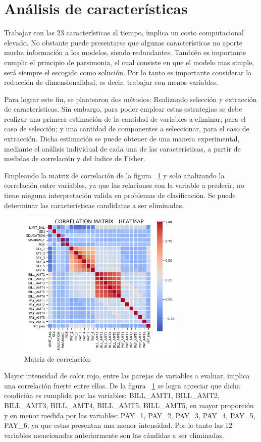 \documentclass[conference]{IEEEtran}
\begin{document}
\section{Análisis de características}
Trabajar con las 23 características al tiempo, implica un costo computacional elevado. No obstante puede presentarse que algunas características no aporte mucha información a los modelos, siendo redundantes.  También es importante cumplir el principio de parsimonia, el cual consiste en que el modelo mas simple, será siempre el escogido como solución. Por lo tanto es importante considerar la reducción de dimensionalidad, es decir, trabajar con menos variables.

Para lograr este fin, se plantearon dos métodos: Realizando selección y extracción de características. Sin embargo, para poder emplear estas estrategias se debe realizar una primera estimación de la cantidad de variables a eliminar, para el caso de selección; y una cantidad de componentes a seleccionar, para el caso de extracción. Dicha estimación se puede obtener de una manera experimental, mediante el análisis individual de cada una de las características, a partir de medidas de correlación y del índice de Fisher.

Empleando la matriz de correlación de la figura ~\ref{fig:matrizCorrelation} y solo analizando la correlación entre variables, ya que las relaciones con la variable a predecir, no tiene ninguna interpretación valida en problemas de clasificación. Se puede determinar las características candidatas a ser eliminadas.
\begin{center}
    \begin{figure}[H]
        \hfill
     \centerline{\includegraphics[width=8cm]{correlacion.png}}
    \caption{Matriz de correlación }
    \label{fig:matrizCorrelation}
    \end{figure}  
\end{center}
Mayor intensidad de color rojo, entre las parejas de variables a evaluar, implica una correlación fuerte entre ellas. De la figura ~\ref{fig:matrizCorrelation} se logra apreciar que dicha condición es cumplida por las variables: BILL\_AMT1, BILL\_AMT2, BILL\_AMT3, BILL\_AMT4, BILL\_AMT5, BILL\_AMT5, en mayor proporción y en menor medida por las variables: PAY\_1, PAY\_2, PAY\_3, PAY\_4, PAY\_5, PAY\_6, ya que estas presentan una menor intensidad. Por lo tanto las 12 variables mencionadas anteriormente son las cándidas a ser eliminadas.
\end{document}

